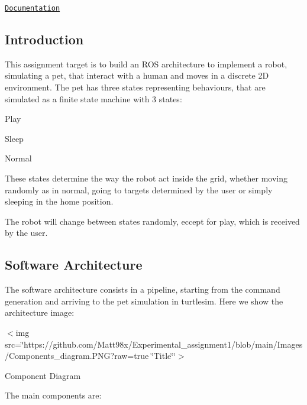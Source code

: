 \href{http://htmlpreview.github.io/?https://github.com/Matt98x/Experimental_assignment1/blob/main/pet_package/html/index.html}{\tt Documentation}

\subsection*{Introduction}

This assignment target is to build an R\+OS architecture to implement a robot, simulating a pet, that interact with a human and moves in a discrete 2D environment. The pet has three states representing behaviours, that are simulated as a finite state machine with 3 states\+:
\begin{DoxyItemize}
\item Play
\item Sleep
\item Normal
\end{DoxyItemize}

These states determine the way the robot act inside the grid, whether moving randomly as in normal, going to targets determined by the user or simply sleeping in the home position.

The robot will change between states randomly, eccept for play, which is received by the user.

\subsection*{Software Architecture}

The software architecture consists in a pipeline, starting from the command generation and arriving to the pet simulation in turtlesim. Here we show the architecture image\+: 

$<$img src=\char`\"{}https\+://github.\+com/\+Matt98x/\+Experimental\+\_\+assignment1/blob/main/\+Images/\+Components\+\_\+diagram.\+P\+N\+G?raw=true \char`\"{}Title\char`\"{}\char`\"{}$>$ 

Component Diagram 

The main components are\+:


